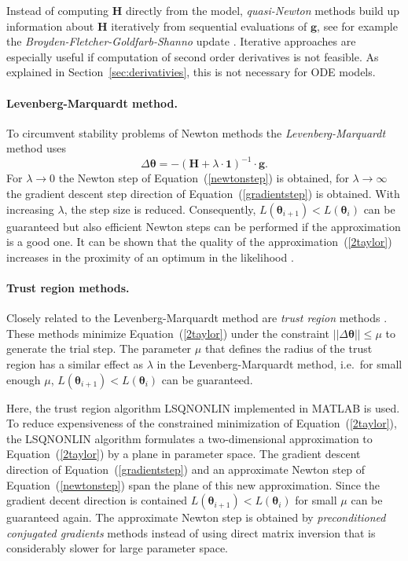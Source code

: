 \documentclass[12pt,a4paper]{scrartcl}
\begin{document}
Instead of computing $\mathbf{H}$ directly from the model, \emph{quasi-Newton} methods 
build up information about $\mathbf{H}$ iteratively from sequential evaluations of $
\mathbf{g}$, see for example the \emph{Broyden-Fletcher-Goldfarb-Shanno} update 
\citep{Shanno:1970fk}. Iterative approaches are especially useful if computation of second order
derivatives is not feasible. As explained in Section~\ref{sec:derivativies}, this is not 
necessary for ODE models.

\paragraph{Levenberg-Marquardt method.}
To circumvent stability problems of Newton methods the \emph{Levenberg-Marquardt} 
method \citep{Marquardt:1963uq} uses 
\begin{equation}
	\Delta \boldsymbol{\theta} = -(\mathbf{H} + \lambda \cdot \mathbf{1})^{-1} \cdot 	
\mathbf{g}. 
\end{equation}	
For $\lambda \rightarrow 0$ the Newton step of Equation~(\ref{newtonstep}) is obtained, 
for $\lambda \rightarrow \infty$ the gradient descent step direction of 
Equation~(\ref{gradientstep}) is obtained. With increasing $\lambda$, the step size is 
reduced. Consequently, $L(\boldsymbol{\theta}_{i+1}) < L(\boldsymbol{\theta}_{i})$ can be 
guaranteed but also efficient Newton steps can be performed if the approximation is a 
good one. It can be shown that the quality of the approximation~(\ref{2taylor}) increases in 
the proximity of an optimum in the likelihood \citep{Seber:2003kq}.

\paragraph{Trust region methods.}
Closely related to the Levenberg-Marquardt method are \emph{trust region} methods 
\citep{Coleman:1996fk}. These methods minimize Equation~(\ref{2taylor}) under the 
constraint $\left|\left| \Delta \boldsymbol{\theta} \right|\right| \leq \mu $ to generate the trial 
step. The parameter $\mu$ that defines the radius of the trust region has a similar effect 
as $\lambda$ in the Levenberg-Marquardt method, i.e.~for small enough $\mu$, 
$L(\boldsymbol{\theta}_{i+1}) < L(\boldsymbol{\theta}_{i})$ can be guaranteed.

Here, the trust region algorithm LSQNONLIN implemented in MATLAB is used. To reduce expensiveness of the constrained minimization of 
Equation~(\ref{2taylor}), the LSQNONLIN algorithm formulates a two-dimensional 
approximation to Equation~(\ref{2taylor}) by a plane in parameter space. The gradient 
descent direction of Equation~(\ref{gradientstep}) and an approximate Newton step of 
Equation~(\ref{newtonstep}) span the plane of this new approximation. Since the gradient 
decent direction is contained $L(\boldsymbol{\theta}_{i+1}) < L(\boldsymbol{\theta}_{i})$ 
for small $\mu$ can be guaranteed again. The approximate Newton step is obtained by 
\emph{preconditioned conjugated gradients} methods \citep{Barrett:1994uq} instead of 
using direct matrix inversion that is considerably slower for large parameter space.
\end{document}
